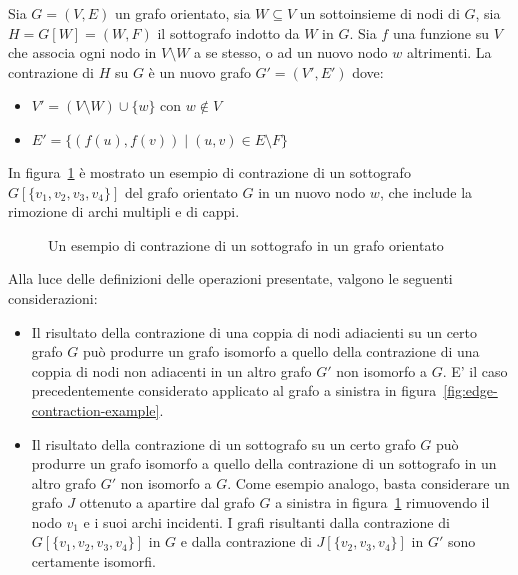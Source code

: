 \begin{definition}
    Sia $G = (V, E)$ un grafo orientato, sia $W \subseteq V$ un sottoinsieme di nodi di $G$, sia $H = G[W] = (W, F)$
    il sottografo indotto da $W$ in $G$.
    Sia $f$ una funzione su $V$ che associa ogni nodo in $V \setminus W$ a se stesso, o ad un nuovo nodo $w$
    altrimenti.
    La contrazione di $H$ su $G$ \`e un nuovo grafo $G' = (V', E')$ dove:
    \begin{itemize}
        \item $V' = (V \setminus W) \cup \{w\}$ con $w \notin V$
        \item $E' = \{(f(u), f(v)) \mid (u, v) \in E \setminus F\}$
    \end{itemize}
\end{definition}

In figura~\ref{fig:subgraph-contraction-example} \`e mostrato un esempio di contrazione di un sottografo
$G[\{v_1, v_2, v_3, v_4\}]$ del grafo orientato $G$ in un nuovo nodo $w$, che include la rimozione di archi multipli
e di cappi. \newline

\begin{figure}[h]
    \centering
    
    \caption{Un esempio di contrazione di un sottografo in un grafo orientato}
    \label{fig:subgraph-contraction-example}
\end{figure}

Alla luce delle definizioni delle operazioni presentate, valgono le seguenti considerazioni:
\begin{itemize}
    \item Il risultato della contrazione di una coppia di nodi adiacienti su un certo grafo $G$ pu\`o produrre un
    grafo isomorfo a quello della contrazione di una coppia di nodi non adiacenti in un altro grafo $G'$ non isomorfo
    a $G$.
    E' il caso precedentemente considerato applicato al grafo a sinistra in figura~\ref{fig:edge-contraction-example}.
    \item Il risultato della contrazione di un sottografo su un certo grafo $G$ pu\`o produrre un grafo isomorfo
    a quello della contrazione di un sottografo in un altro grafo $G'$ non isomorfo a $G$.
    Come esempio analogo, basta considerare un grafo $J$ ottenuto a apartire dal grafo $G$ a sinistra in
    figura~\ref{fig:subgraph-contraction-example} rimuovendo il nodo $v_1$ e i suoi archi incidenti.
    I grafi risultanti dalla contrazione di $G[\{v_1, v_2, v_3, v_4\}]$ in $G$ e dalla contrazione di
    $J[\{v_2, v_3, v_4\}]$ in $G'$ sono certamente isomorfi.
\end{itemize}

